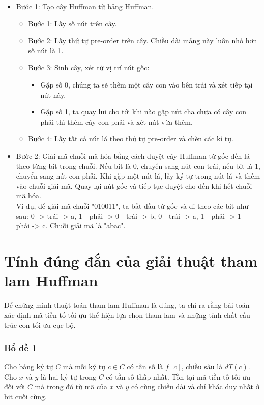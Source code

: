         \begin{itemize}
            \item Bước 1: Tạo cây Huffman từ bảng Huffman.
                \begin{itemize}
                    \item Bước 1: Lấy số nút trên cây.
                    \item Bước 2: Lấy thứ tự pre-order trên cây. Chiều dài mảng này luôn nhỏ hơn số nút là 1.
                    \item Bước 3: Sinh cây, xét từ vị trí nút gốc:
                        \begin{itemize}
                            \item Gặp số 0, chúng ta sẽ thêm một cây con vào bên trái và xét tiếp tại nút này.
                            \item Gặp số 1, ta quay lui cho tới khi nào gặp nút cha chưa có cây con phải thì thêm cây con phải và xét nút vừa thêm.
                        \end{itemize}
                    \item Bước 4: Lấy tất cả nút lá theo thứ tự pre-order và chèn các kí tự.
                \end{itemize}
            \item Bước 2: Giải mã chuỗi mã hóa bằng cách duyệt cây Huffman từ gốc đến lá theo từng bit trong chuỗi. Nếu bit là 0, chuyển sang nút con trái, nếu bit là 1, chuyển sang nút con phải. Khi gặp một nút lá, lấy ký tự trong nút lá và thêm vào chuỗi giải mã. Quay lại nút gốc và tiếp tục duyệt cho đến khi hết chuỗi mã hóa. \\
            Ví dụ, để giải mã chuỗi "010011", ta bắt đầu từ gốc và đi theo các bit như sau: 0 -> trái -> a, 1 - phải -> 0 - trái -> b, 0 - trái -> a, 1 - phải -> 1 - phải -> c. Chuỗi giải mã là "abac".
        \end{itemize}

\section{Tính đúng đắn của giải thuật tham lam Huffman}

Để chứng minh thuật toán tham lam Huffman là đúng, ta chỉ ra rằng bài toán xác định mã tiền tố tối ưu thể hiện lựa chọn tham lam và những tính chất cấu trúc con tối ưu cục bộ. \\

\subsubsection{Bổ đề 1} Cho bảng ký tự $C$ mà mỗi ký tự $c \in C$ có tần số là $f[c]$, chiều sâu là $dT(c)$. Cho $x$ và $y$ là hai ký tự trong $C$ có tần số thấp nhất. Tồn tại mã tiền tố tối ưu đối với $C$ mà trong đó từ mã của $x$ và $y$ có cùng chiều dài và chỉ khác duy nhất ở bit cuối cùng. \\

